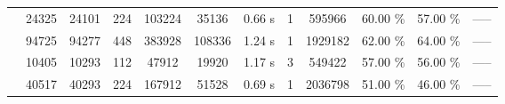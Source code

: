 \begin{table}[ht]
\begin{tabular}{ |c|c|c|c|c|c|c|c|c|c| }
 & 24325 & 24101 & 224 & 103224 & 35136 & 0.66 s & 1 & 595966 & 60.00 \% & 57.00 \% & ----- \\
 & 94725 & 94277 & 448 & 383928 & 108336 & 1.24 s & 1 & 1929182 & 62.00 \% & 64.00 \% & ----- \\
 & 10405 & 10293 & 112 & 47912 & 19920 & 1.17 s & 3 & 549422 & 57.00 \% & 56.00 \% & ----- \\
 & 40517 & 40293 & 224 & 167912 & 51528 & 0.69 s & 1 & 2036798 & 51.00 \% & 46.00 \% & ----- \\
\hline
\end{tabular}
\end{table}

